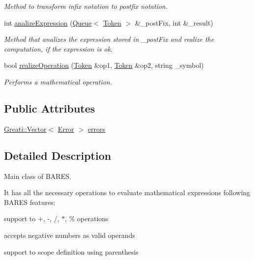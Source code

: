 \begin{DoxyCompactItemize}
\begin{DoxyCompactList}\small\item\em Method to transform infix notation to postfix notation. \end{DoxyCompactList}\item 
int \hyperlink{classBares_a8915cf42bc7a36085f1a5bda21cc2258}{analize\+Expression} (\hyperlink{classQueue}{Queue}$<$ \hyperlink{structBares_1_1Token}{Token} $>$ \&\+\_\+post\+Fix, int \&\+\_\+result)
\begin{DoxyCompactList}\small\item\em Method that analizes the expression stored in \+\_\+post\+Fix and realize the computation, if the expression is ok. \end{DoxyCompactList}\item 
bool \hyperlink{classBares_a4cf327759f7f057ddc4d426be5dc14e9}{realize\+Operation} (\hyperlink{structBares_1_1Token}{Token} \&op1, \hyperlink{structBares_1_1Token}{Token} \&op2, string \+\_\+symbol)
\begin{DoxyCompactList}\small\item\em Performs a mathematical operation. \end{DoxyCompactList}\end{DoxyCompactItemize}
\subsection*{Public Attributes}
\begin{DoxyCompactItemize}
\item 
\hyperlink{classGreati_1_1Vector}{Greati\+::\+Vector}$<$ \hyperlink{structBares_1_1Error}{Error} $>$ \hyperlink{classBares_a094796228fccdb1ce41ab8ab6c2a2a4c}{errors}
\end{DoxyCompactItemize}


\subsection{Detailed Description}
Main class of B\+A\+R\+ES. 

It has all the necessary operations to evaluate mathematical expressions following B\+A\+R\+ES features\+:
\begin{DoxyItemize}
\item support to +, -\/, /, $\ast$, \% operations
\item accepts negative numbers as valid operands
\item support to scope definition using parenthesis
\end{DoxyItemize}

